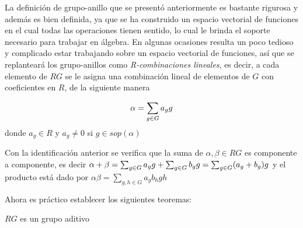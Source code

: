 La definición de grupo-anillo que se presentó anteriormente es bastante rigurosa y además es bien definida, ya que se ha construido un espacio vectorial de funciones en el cual todas las operaciones tienen sentido, lo cual le brinda el soporte necesario para trabajar en álgebra. En algunas ocasiones resulta un poco tedioso y complicado estar trabajando sobre un espacio vectorial de funciones, así que se replanteará los grupo-anillos como \textit{R-combinaciones lineales}, es decir, a cada elemento de $RG$ se le asigna una combinación lineal de elementos de $G$ con coeficientes en $R$, de la siguiente manera

\begin{equation}
\alpha = \sum_{g \in G} a_{g} g
\end{equation}
donde $a_g \in R$ y $a_g \neq 0$ si $g \in sop(\alpha)$


\begin{nota}
Con la identificación anterior se verifica que la suma de $\alpha, \beta \in RG$ es componente a componente, es decir $\alpha + \beta= \sum_{g \in G} a_{g} g+\sum_{g \in G} b_{g} g= \sum_{g\in G} (a_g+b_g)g $ y el producto está dado por $\alpha\beta=\sum_{g,h\in G}a_gb_hgh$

\end{nota}


Ahora es práctico establecer los siguientes teoremas:

\begin{teorema}\label{grupo}
$RG$ es un grupo aditivo

\end{teorema}

